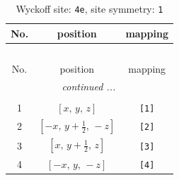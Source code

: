 \documentclass[fleqn,8pt]{jsarticle}
\begin{document}
\begin{longtable}{ccc}
\caption{Wyckoff site: {\tt 4e}, site symmetry: {\tt 1}}
 \\
 \hline \hline
No. & position & mapping \\ \hline \endfirsthead

\multicolumn{2}{l}{\tablename\ \thetable{}} \\
 \hline \hline
No. & position & mapping \\ \hline \endhead

 \hline \hline
\multicolumn{2}{r}{\footnotesize\it continued ...} \\ \endfoot

 \hline \hline
\multicolumn{2}{r}{} \\ \endlastfoot

1 & $\left[ x,\, y,\, z \right]$ & {\tt [1]} \\ \hline
2 & $\left[ - x,\, y + \frac{1}{2},\, - z \right]$ & {\tt [2]} \\ \hline
3 & $\left[ x,\, y + \frac{1}{2},\, z \right]$ & {\tt [3]} \\ \hline
4 & $\left[ - x,\, y,\, - z \right]$ & {\tt [4]} \\
\end{longtable}
\end{document}
